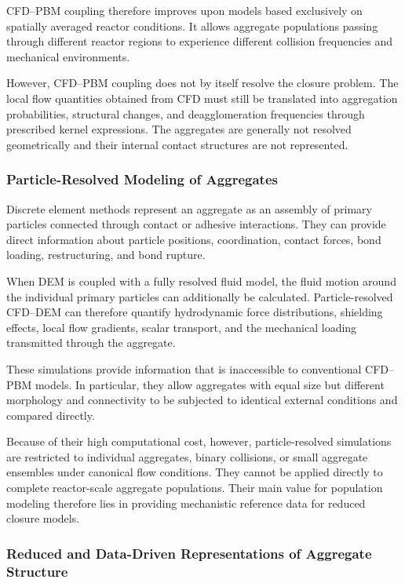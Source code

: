 \documentclass[11pt,a4paper,twoside]{scrartcl}
\begin{document}
CFD--PBM coupling therefore improves upon models based exclusively on spatially averaged reactor conditions. It allows aggregate populations passing through different reactor regions to experience different collision frequencies and mechanical environments.

However, CFD--PBM coupling does not by itself resolve the closure problem. The local flow quantities obtained from CFD must still be translated into aggregation probabilities, structural changes, and deagglomeration frequencies through prescribed kernel expressions. The aggregates are generally not resolved geometrically and their internal contact structures are not represented.

\subsubsection{Particle-Resolved Modeling of Aggregates}

Discrete element methods represent an aggregate as an assembly of primary particles connected through contact or adhesive interactions. They can provide direct information about particle positions, coordination, contact forces, bond loading, restructuring, and bond rupture.

When DEM is coupled with a fully resolved fluid model, the fluid motion around the individual primary particles can additionally be calculated. Particle-resolved CFD--DEM can therefore quantify hydrodynamic force distributions, shielding effects, local flow gradients, scalar transport, and the mechanical loading transmitted through the aggregate.

These simulations provide information that is inaccessible to conventional CFD--PBM models. In particular, they allow aggregates with equal size but different morphology and connectivity to be subjected to identical external conditions and compared directly.

Because of their high computational cost, however, particle-resolved simulations are restricted to individual aggregates, binary collisions, or small aggregate ensembles under canonical flow conditions. They cannot be applied directly to complete reactor-scale aggregate populations. Their main value for population modeling therefore lies in providing mechanistic reference data for reduced closure models.

\subsubsection{Reduced and Data-Driven Representations of Aggregate Structure}
\end{document}
